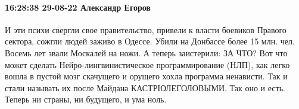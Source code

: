 \paragraph{16:28:38 29-08-22 Александр Егоров}

И эти психи свергли свое правительство, привели к власти боевиков Правого сектора, сожгли людей заживо в Одессе.
Убили на Донбассе более 15 млн. чел.
Восемь лет звали Москалей на ножи.
А теперь заистерили: ЗА ЧТО?
Вот что может сделать Нейро-лингвинистическое программирование (НЛП), как легко вошла в пустой мозг скачущего и орущего хохла программа ненависти.
Так и стали называть их после Майдана КАСТРЮЛЕГОЛОВЫМИ.
Так оно и есть.
Теперь ни страны, ни будущего, и ума ноль.



